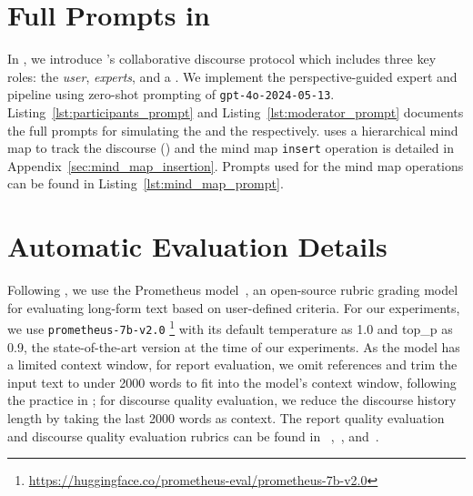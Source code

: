 \section{Full Prompts in \system}
\label{appendix:prompts}
In , we introduce \system’s collaborative discourse protocol which includes three key roles: the \textit{user}, \textit{experts}, and a \textit{\moderator}. We implement the perspective-guided expert and \moderator pipeline using zero-shot prompting of \texttt{gpt-4o-2024-05-13}. Listing~\ref{lst:participants_prompt} and Listing~\ref{lst:moderator_prompt} documents the full prompts for simulating the \expert and the \moderator respectively. \system uses a hierarchical mind map to track the discourse () and the mind map \texttt{insert} operation is detailed in Appendix~\ref{sec:mind_map_insertion}. %
Prompts used for the mind map operations can be found in Listing~\ref{lst:mind_map_prompt}. 


\section{Automatic Evaluation Details}
\label{appendix:rubric}
Following \citet{shao2024assisting}, we use the Prometheus model~\citep{kim2024prometheus}, an open-source rubric grading model for evaluating long-form text based on user-defined criteria. For our experiments, we use \texttt{prometheus-7b-v2.0} \footnote{\url{https://huggingface.co/prometheus-eval/prometheus-7b-v2.0}} with its default temperature as 1.0 and top\_p as 0.9, the state-of-the-art version at the time of our experiments. As the model has a limited context window, for report evaluation, we omit references and trim the input text to under 2000 words to fit into the model’s context window, following the practice in \citet{shao2024assisting}; for discourse quality evaluation, we reduce the discourse history length by taking the last 2000 words as context. The report quality evaluation and discourse quality evaluation rubrics can be found in ~,~, and~.

